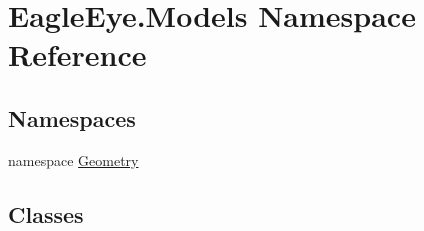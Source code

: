 \hypertarget{namespace_eagle_eye_1_1_models}{}\section{Eagle\+Eye.\+Models Namespace Reference}
\label{namespace_eagle_eye_1_1_models}
\subsection*{Namespaces}
\begin{DoxyCompactItemize}
\item 
namespace \mbox{\hyperlink{namespace_eagle_eye_1_1_models_1_1_geometry}{Geometry}}
\end{DoxyCompactItemize}
\subsection*{Classes}
